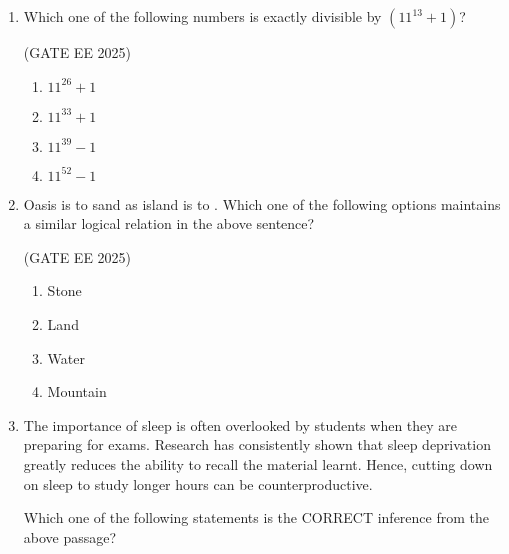 \documentclass[journal,12pt,onecolumn]{IEEEtran}
\theoremstyle{remark}
\begin{document}
\begin{enumerate}
\hfill(GATE EE 2025)

\begin{multicols}{4}
\begin{enumerate}
\item $396$
\item $324$
\item $216$
\item $144$
\end{enumerate}
\end{multicols}

\item Which one of the following numbers is exactly divisible by $(11^{13}+1)$?  

\hfill(GATE EE 2025)

\begin{multicols}{4}
\begin{enumerate}
\item $11^{26}+1$
\item $11^{33}+1$
\item $11^{39}-1$
\item $11^{52}-1$
\end{enumerate}
\end{multicols}

\item Oasis is to sand as island is to \underline{\hspace{2cm}}.  
Which one of the following options maintains a similar logical relation in the above sentence?  

\hfill(GATE EE 2025)

\begin{multicols}{4}
\begin{enumerate}
\item Stone
\item Land
\item Water
\item Mountain
\end{enumerate}
\end{multicols}

\item The importance of sleep is often overlooked by students when they are preparing for exams. Research has consistently shown that sleep deprivation greatly reduces the ability to recall the material learnt. Hence, cutting down on sleep to study longer hours can be counterproductive.  

Which one of the following statements is the CORRECT inference from the above passage?  


\end{enumerate}
\end{document}
